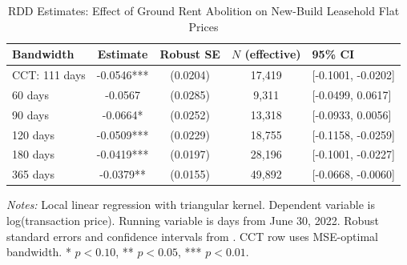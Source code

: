 \begin{table}[H]
\centering
\caption{RDD Estimates: Effect of Ground Rent Abolition on New-Build Leasehold Flat Prices}
\label{tab:rdd}
\begin{threeparttable}
\begin{tabular}{lcccl}
\toprule
Bandwidth & Estimate & Robust SE & $N$ (effective) & 95\% CI \\
\midrule
CCT: 111 days & -0.0546*** & (0.0204) & 17,419 & [-0.1001, -0.0202] \\
60 days & -0.0567 & (0.0285) & 9,311 & [-0.0499, 0.0617] \\
90 days & -0.0664* & (0.0252) & 13,318 & [-0.0933, 0.0056] \\
120 days & -0.0509*** & (0.0229) & 18,755 & [-0.1158, -0.0259] \\
180 days & -0.0419*** & (0.0197) & 28,196 & [-0.1001, -0.0227] \\
365 days & -0.0379** & (0.0155) & 49,892 & [-0.0668, -0.0060] \\
\bottomrule
\end{tabular}
\begin{tablenotes}[flushleft]
\small
\item \textit{Notes:} Local linear regression with triangular kernel. Dependent variable is log(transaction price). Running variable is days from June 30, 2022. Robust standard errors and confidence intervals from \citet{cattaneo2020}. CCT row uses MSE-optimal bandwidth. * $p<0.10$, ** $p<0.05$, *** $p<0.01$.
\end{tablenotes}
\end{threeparttable}
\end{table}
